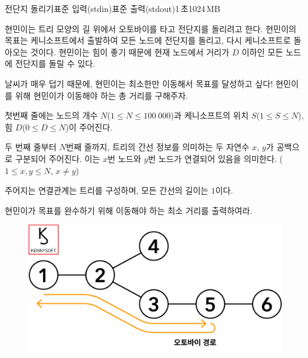 \begin{problem}{전단지 돌리기}{표준 입력(stdin)}{표준 출력(stdout)}{1\,초}{1024\,MB}

현민이는 트리 모양의 길 위에서 오토바이를 타고 전단지를 돌리려고 한다. 현민이의 목표는 케니소프트에서 출발하여 모든 노드에 전단지를 돌리고, 다시 케니소프트로 돌아오는 것이다. 현민이는 힘이 좋기 때문에 현재 노드에서 거리가 $D$ 이하인 모든 노드에 전단지를 돌릴 수 있다.

날씨가 매우 덥기 때문에, 현민이는 최소한만 이동해서 목표를 달성하고 싶다! 현민이를 위해 현민이가 이동해야 하는 총 거리를 구해주자.

\InputFile
첫번째 줄에는 노드의 개수 $N$($ 1 \leq N \leq 100\ 000 $)과 케니소프트의 위치 $S$($ 1 \leq S \leq N $), 힘 $D$($ 0 \leq D \leq N $)이 주어진다.

두 번째 줄부터 $N$번째 줄까지, 트리의 간선 정보를 의미하는 두 자연수 $x$, $y$가 공백으로 구분되어 주어진다. 이는 $x$번 노드와 $y$번 노드가 연결되어 있음을 의미한다. ($1 \leq x, y \leq N$, $x \neq y$)

주어지는 연결관계는 트리를 구성하며, 모든 간선의 길이는 $1$이다. 

\OutputFile
현민이가 목표를 완수하기 위해 이동해야 하는 최소 거리를 출력하여라.

\Example

\begin{example}
\end{example}

\begin{figure}[h!]
\centering
  \includegraphics[width=.6\linewidth]{../pictures/leaflet@4x.png}
\end{figure}

\end{problem}